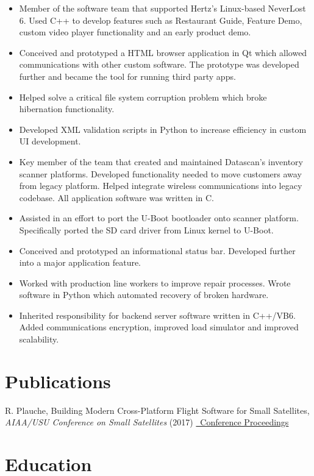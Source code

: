 \documentclass[10pt, letterpaper]{moderncv}
\begin{document}
	{
		\begin{itemize}[rightmargin=30mm]
			\item Member of the software team that supported Hertz's Linux-based NeverLost 6. Used C++ to develop features such as Restaurant Guide, Feature Demo, custom video player functionality and an early product demo.
      \item Conceived and prototyped a HTML browser application in Qt which allowed communications with other custom software. The prototype was developed further and became the tool for running third party apps.
			\item Helped solve a critical file system corruption problem which broke hibernation functionality.
      \item Developed XML validation scripts in Python to increase efficiency in custom UI development.
		\end{itemize}
	}

  \pagebreak

	{
		\begin{itemize}[rightmargin=30mm]
			\item Key member of the team that created and maintained Datascan's inventory scanner platforms. Developed functionality needed to move customers away from legacy platform. Helped integrate wireless communications into legacy codebase. All application software was written in C.
			\item Assisted in an effort to port the U-Boot bootloader onto scanner platform. Specifically ported the SD card driver from Linux kernel to U-Boot.
			\item Conceived and prototyped an informational status bar. Developed further into a major application feature.
			\item Worked with production line workers to improve repair processes. Wrote software in Python which automated recovery of broken hardware.
			\item Inherited responsibility for backend server software written in C++/VB6. Added communications encryption, improved load simulator and improved scalability.
		\end{itemize}
	}


  \section{Publications}
  \label{sec:highlights}

  \cvline{}%
  {
    \small R. Plauche, Building Modern Cross-Platform Flight Software for Small Satellites,
    \emph{AIAA/USU Conference on Small Satellites}
    (2017)
    \href{https://digitalcommons.usu.edu/smallsat/2017/all2017/204/}
    {\color{color2}\homepagesymbol~Conference Proceedings}
  }


	\section{Education}
\end{document}
